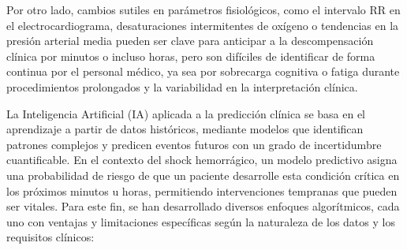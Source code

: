 Por otro lado, cambios sutiles en parámetros fisiológicos, como el intervalo RR en el electrocardiograma, desaturaciones intermitentes de oxígeno o tendencias en la presión arterial media pueden ser clave para anticipar a la descompensación clínica por minutos o incluso horas, pero son difíciles de identificar de forma continua por el personal médico, ya sea por sobrecarga cognitiva o fatiga durante procedimientos prolongados y la variabilidad en la interpretación clínica.

La Inteligencia Artificial (IA) aplicada a la predicción clínica se basa en el aprendizaje a partir de datos históricos, mediante modelos que identifican patrones complejos y predicen eventos futuros con un grado de incertidumbre cuantificable. En el contexto del shock hemorrágico, un modelo predictivo asigna una probabilidad de riesgo de que un paciente desarrolle esta condición crítica en los próximos minutos u horas, permitiendo intervenciones tempranas que pueden ser vitales. Para este fin, se han desarrollado diversos enfoques algorítmicos, cada uno con ventajas y limitaciones específicas según la naturaleza de los datos y los requisitos clínicos:

